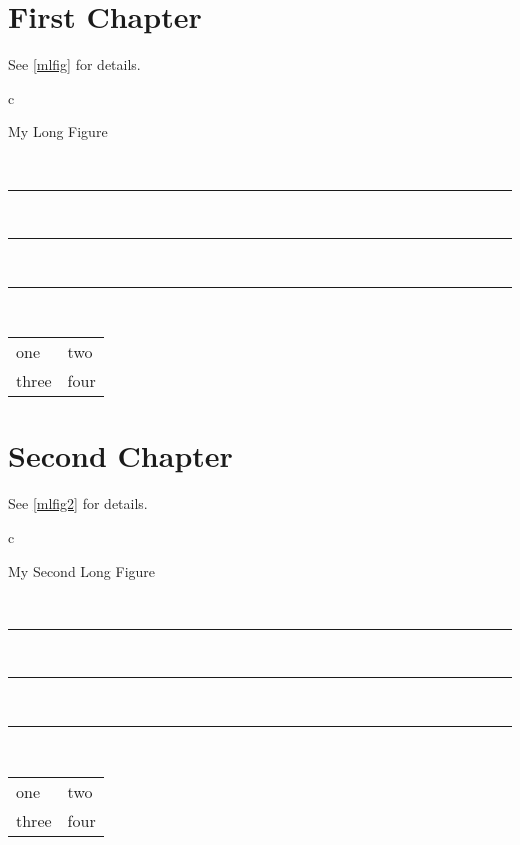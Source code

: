 \documentclass{book}
\begin{document}
\listoffigures
\chapter{First Chapter}
See \ref{mlfig} for details.

\begin{longfigure}{c}
\caption{My Long Figure}\label{mlfig}\\
\rule{3in}{1in}\\
\rule{3in}{1in}\\
\pagebreak
\rule{3in}{1in}\\

\begin{tabular}{ll}
one & two \\
three & four\\
\end{tabular}
\end{longfigure}

\chapter{Second Chapter}

See \ref{mlfig2} for details.
\begin{longfigure}{c}
\caption{My Second Long Figure}\label{mlfig2}\\
\rule{3in}{1in}\\
\rule{3in}{1in}\\
\rule{3in}{1in}\\
\begin{tabular}{ll}
one & two \\
three & four\\
\end{tabular}
\end{longfigure}
\end{document}
